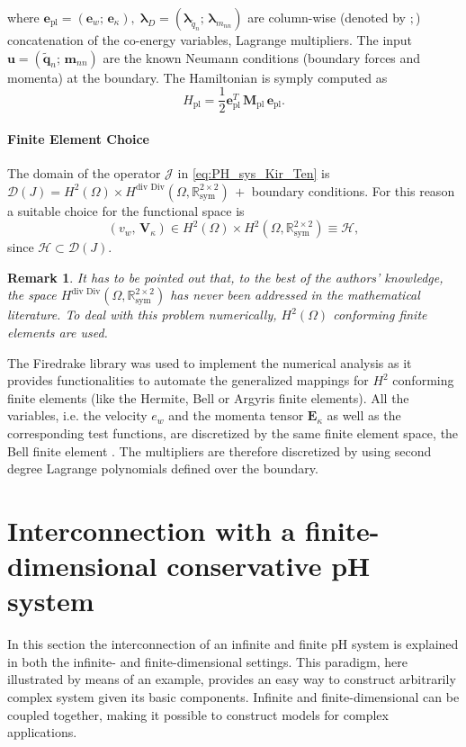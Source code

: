 \documentclass[letterpaper, 10 pt, conference]{ieeeconf}
\newtheorem{remark}{Remark}
\begin{document}
where $\bm{e}_{\text{pl}} = (\bm{e}_w; \, \bm{e}_\kappa), \;  \bm{\lambda}_D = (\bm{\lambda}_{\widetilde{q}_n}; \, \bm{\lambda}_{m_{nn}})$ are column-wise (denoted by $;$) concatenation of the co-energy variables, Lagrange multipliers. The input $\bm{u} = (\widetilde{\bm{q}}_n; \, \bm{m}_{nn})$ are the known Neumann conditions (boundary forces and momenta) at the boundary. 
 The Hamiltonian is symply computed as
\begin{equation} \label{eq:H_discr}
H_{\text{pl}} = \frac{1}{2} \bm{e}_{\text{pl}}^T \, \bm{M}_{\text{pl}} \, \bm{e}_{\text{pl}}.
\end{equation}

\paragraph{Finite Element Choice}
\label{par:FE}
The domain of the operator $\mathcal{J}$ in \eqref{eq:PH_sys_Kir_Ten} is $\mathcal{D}(J) = H^{2}(\Omega) \times  H^{\text{div Div}}(\Omega, \mathbb{R}^{2 \times 2}_{\text{sym}}) \,+ $ boundary conditions. For this reason a suitable choice for the functional space is
\begin{equation}
(v_w, \,\bm{V}_\kappa) \in H^{2}(\Omega) \times H^{2}(\Omega, \mathbb{R}^{2 \times 2}_{\text{sym}}) \equiv \mathscr{H},
\end{equation}
since $\mathscr{H} \subset \mathcal{D}(J)$. 
\begin{remark}
It has to be pointed out that, to the best of the authors' knowledge, the space $H^{\text{div Div}}(\Omega, \mathbb{R}^{2 \times 2}_{\text{sym}})$ has never been addressed in the mathematical literature. To deal with this problem numerically, $H^{2}(\Omega)$ conforming finite elements are used. 
\end{remark}
The Firedrake library \cite{firedrake} was used to implement the numerical analysis as it provides functionalities to automate the generalized mappings for $H^2$ conforming finite elements (like the Hermite, Bell or Argyris finite elements). All the variables, i.e. the velocity $e_w$ and the momenta tensor $\bm{E}_\kappa$ as well as the corresponding test functions, are discretized by the same finite element space, the Bell finite element \cite{Bell}. The multipliers are therefore discretized by using second degree Lagrange polynomials defined over the boundary.


\section{Interconnection with a finite-dimensional conservative pH system}
\label{sec:Int}
In this section the interconnection of an infinite and finite pH system is explained in both the infinite- and finite-dimensional settings. This paradigm, here illustrated by means of an example, provides an easy way to construct arbitrarily complex system given its basic components. 
Infinite and finite-dimensional can be coupled together, making it possible to construct models for complex applications. 
\end{document}
